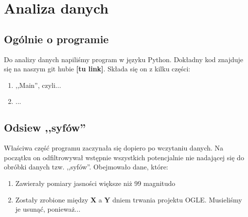 \documentclass[a4paper,11pt]{article}
\newcommand{\ak}{\hspace{0.7 cm}}
\begin{document}
\section{Analiza danych}
\subsection{Ogólnie o programie}
\ak Do analizy danych napiliśmy program w języku Python. Dokładny kod znajduje się na naszym git hubie \textbf{[tu link]}. Składa się on z kilku części:
\begin{enumerate}
\item ,,Main'', czyli... 
\item ...
\end{enumerate} 
\subsection{Odsiew ,,syfów''}
\ak Właściwa część programu zaczynała się dopiero po wczytaniu danych. Na początku on odfiltrowywał wstępnie wszystkich potencjalnie nie nadającej się do obróbki danych tzw. ,,syfów''. Obejmowało dane, które:
\begin{enumerate}
\item Zawierały pomiary jasności większe niż 99 magnitudo 
\item Zostały zrobione między \textbf{X} a \textbf{Y} dniem trwania projektu OGLE. Musieliśmy je usunąć, ponieważ...
\end{enumerate}
\end{document}
